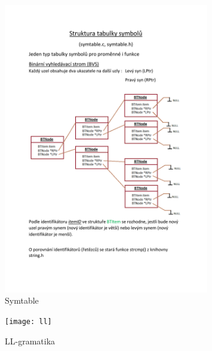\documentclass[11pt, a4paper]{article}
\begin{document}
 \begin{figure} [h]
	\begin{center}
		\includegraphics[width=0.8\textwidth]{symtable}	
		\caption{Symtable}
		\label{symtable}
	\end{center}
		\end{figure}	
\begin{figure}[h]
		\begin{center}
			\texttt{[image: ll]}
			\caption{LL-gramatika}
			\label{ll}
		\end{center}
		\end{figure}
		
\end{document}

